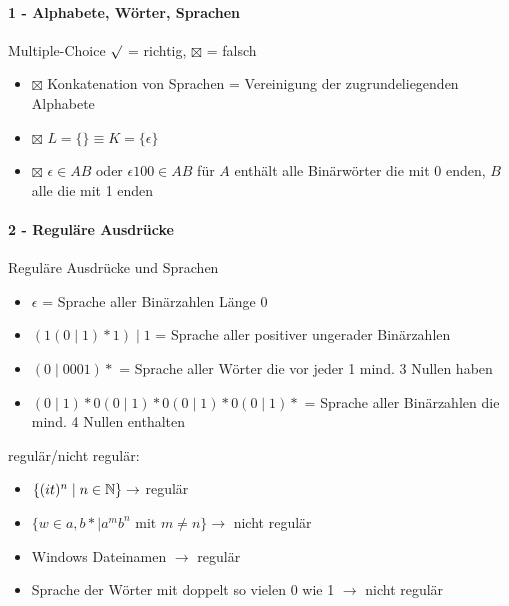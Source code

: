 \paragraph*{1 - Alphabete, Wörter, Sprachen}

\begin{example2}{Multiple-Choice} $\surd$ = richtig, $\boxtimes$ = falsch
    \begin{itemize}
        \item $\boxtimes$ Konkatenation von Sprachen = Vereinigung der zugrundeliegenden Alphabete
        \item $\boxtimes$ $L = \{\} \equiv K = \{\epsilon\}$
        \item $\boxtimes$ $\epsilon \in AB$ oder $\epsilon100 \in AB$ 
        für $A$ enthält alle Binärwörter die mit 0 enden, $B$ alle die mit 1 enden
    \end{itemize}
\end{example2}

\paragraph*{2 - Reguläre Ausdrücke}

\begin{example2}{Reguläre Ausdrücke und Sprachen}
    \begin{itemize}
        \item $\epsilon$ = Sprache aller Binärzahlen Länge 0
        \item $(1(0 \mid 1)*1) \mid 1$ = Sprache aller positiver ungerader Binärzahlen
        \item $(0 \mid 0001)*$ = Sprache aller Wörter die vor jeder 1 mind. 3 Nullen haben
        \item $(0 \mid 1)*0(0 \mid 1)*0(0 \mid 1)*0(0 \mid 1)*$ = Sprache aller Binärzahlen die mind. 4 Nullen enthalten
    \end{itemize}

    \vspace{2mm}

    regulär/nicht regulär:
    \begin{itemize}
        \item $\{(it)^n \mid n \in \mathbb{N}\} \rightarrow$ regulär
        \item $\{w \in {a,b}* \mid a^m b^n \text { mit } m \neq n\} \rightarrow$ nicht regulär
        \item Windows Dateinamen $\rightarrow$ regulär
        \item Sprache der Wörter mit doppelt so vielen 0 wie 1 $\rightarrow$ nicht regulär
    \end{itemize}
\end{example2}

